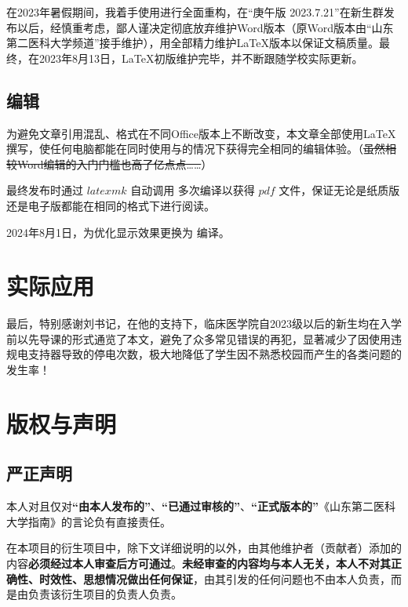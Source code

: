 在2023年暑假期间，我着手使用\XeLaTeX 进行全面重构，在“庚午版 2023.7.21”在新生群发布以后，经慎重考虑，鄙人谨决定彻底放弃维护Word版本（原Word版本由“山东第二医科大学频道”接手维护），用全部精力维护LaTeX版本以保证文稿质量。最终，在2023年8月13日，LaTeX初版维护完毕，并不断跟随学校实际更新。

\subsection[编辑]{编辑}
为避免文章引用混乱、格式在不同Office版本上不断改变，本文章全部使用\LaTeX 撰写，使任何电脑都能在同时使用与\footnotemark 的情况下获得完全相同的编辑体验。（\st{虽然相较Word编辑的入门门槛也高了亿点点……}）

最终发布时通过 $latexmk$ 自动调用 \XeTeX 多次编译以获得 $pdf$ 文件，保证无论是纸质版还是电子版都能在相同的格式下进行阅读。

2024年8月1日，为优化显示效果更换为 \LuaTeX 编译。

\section[实际应用]{实际应用}
最后，特别感谢刘书记，在他的支持下，临床医学院自2023级以后的新生均在入学前以先导课的形式通览了本文，避免了众多常见错误的再犯，显著减少了因使用违规电支持器导致的停电次数，极大地降低了学生因不熟悉校园而产生的各类问题的发生率！

\section[版权与声明]{版权与声明}
\subsection[严正声明]{严正声明}
本人对且仅对\textbf{“由本人发布的”}、\textbf{“已通过审核的”}、\textbf{“正式版本的”}《山东第二医科大学指南》的言论负有直接责任。

在本项目的衍生项目中，除下文详细说明的以外，由其他维护者（贡献者）添加的内容\textbf{必须经过本人审查后方可通过}。\textbf{未经审查的内容均与本人无关，本人不对其正确性、时效性、思想情况做出任何保证}，由其引发的任何问题也不由本人负责，而是由负责该衍生项目的负责人负责。

